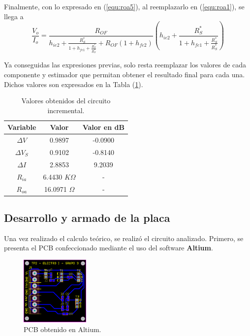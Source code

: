 Finalmente, con lo expresado en (\ref{equ:roa5}), al reemplazarlo en (\ref{equ:roa1}), se llega a
\begin{equation}
	\frac{V_o}{I_o} = \frac{R_{OF}}{h_{ie2} + \frac{R_{S}^{*}} {1 + h_{fe1} + \frac{R_{S}^{*}}{R_{S}^{*}}}  + R_{OF} \left( 1 + h_{fe2} \right)} \left( h_{ie2} + \frac{R_{S}^{*}} {1 + h_{fe1} + \frac{R_{S}^{*}}{R_{S}^{*}}}  \right)
	\label{equ:roa}
\end{equation}

Ya conseguidas las expresiones previas, solo resta reemplazar los valores de cada componente y estimador que permitan obtener el resultado final para cada una. Dichos valores son expresados en la Tabla (\ref{tab:resultados}).

\begin{table}[H]
\centering
\begin{tabular}{ccc}
\hline
\textbf{Variable} & \textbf{Valor} & \textbf{Valor en dB} \\
\hline
$\Delta V$ & 0.9897 & -0.0900 \\
$\Delta V_S$ & 0.9102 & -0.8140 \\
$\Delta I$ & 2.8853 & 9.2039 \\
$R_{ia}$ & 6.4430 $K\Omega$ & - \\
$R_{oa}$ & 16.0971 $\Omega$ & - \\
\hline
\end{tabular}
\caption{Valores obtenidos del circuito incremental.}
\label{tab:resultados}
\end{table}

\subsection{Desarrollo y armado de la placa}
Una vez realizado el calculo teórico, se realizó el circuito analizado. Primero, se presenta el PCB confeccionado mediante el uso del software \textbf{Altium}.
\begin{figure}[H]
\centering
	\includegraphics[width=0.3\textwidth]{Imagenes/PCB.png}
	\caption{PCB obtenido en Altium.}
\end{figure}

